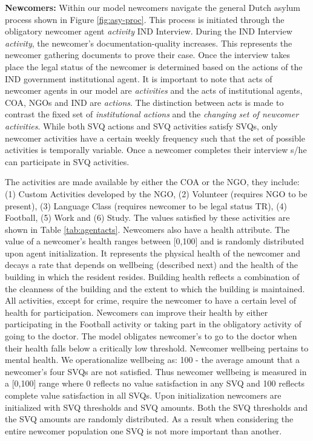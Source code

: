 \documentclass{scspaperproc}
\theoremstyle{scsthe}
\begin{document}
{\bf Newcomers:} Within our model newcomers navigate the general Dutch asylum process shown in Figure \ref{fig:asy-proc}. This process is initiated through the obligatory newcomer agent \emph{activity} IND Interview. During the IND Interview \emph{activity}, the newcomer's documentation-quality increases. This represents the newcomer gathering documents to prove their case. Once the interview takes place the legal status of the newcomer is determined based on the actions of the IND government institutional agent. It is important to note that acts of newcomer agents in our model are \emph{activities} and the acts of institutional agents, COA, NGOs and IND are \emph{actions}. The distinction between acts is made to contrast the fixed set of \emph{institutional actions} and the \emph{changing set of newcomer activities}. While both SVQ actions and SVQ activities satisfy SVQs, only newcomer activities have a certain weekly frequency such that the set of possible activities is temporally variable. Once a newcomer completes their interview s/he can participate in SVQ activities. 

The activities are made available by either the COA or the NGO, they include: (1) Custom Activities developed by the NGO, (2) Volunteer (requires NGO to be present), (3) Language Class (requires newcomer to be legal status TR), (4) Football, (5) Work and (6) Study. The values satisfied by these activities are shown in Table \ref{tab:agentacts}. Newcomers also have a health attribute. The value of a newcomer's health ranges between [0,100] and is randomly distributed upon agent initialization. It represents the physical health of the newcomer and decays a rate that depends on wellbeing (described next) and the health of the building in which the resident resides. Building health reflects a combination of the cleanness of the building and the extent to which the building is maintained. All activities, except for crime, require the newcomer to have a certain level of health for participation. Newcomers can improve their health by either participating in the Football activity or taking part in the obligatory activity of going to the doctor. The model obligates newcomer's to go to the doctor when their health falls below a critically low threshold. Newcomer wellbeing pertains to mental health. We operationalize wellbeing as: 100 - the average amount that a newcomer's four SVQs are not satisfied. Thus newcomer wellbeing is measured in a [0,100] range where 0 reflects no value satisfaction in any SVQ and 100 reflects complete value satisfaction in all SVQs. Upon initialization newcomers are initialized with SVQ thresholds and SVQ amounts. Both the SVQ thresholds and the SVQ amounts are randomly distributed. As a result when considering the entire newcomer population one SVQ is not more important than another. 
\end{document}
